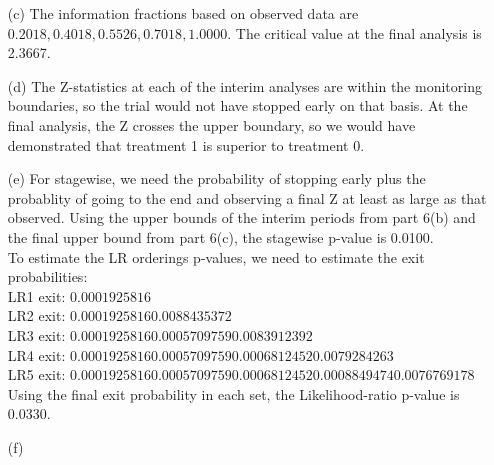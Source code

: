 \documentclass[11pt,a4paper]{article}
\begin{document}
\begin{enumerate}
\begin{enumerate}
\item[(c)] The information fractions based on observed data are $0.2018, 0.4018, 0.5526, 0.7018, 1.0000$. The critical value at the final analysis is 2.3667.

\item[(d)] The Z-statistics at each of the interim analyses are within the monitoring boundaries, so the trial would not have stopped early on that basis. At the final analysis, the Z crosses the upper boundary, so we would have demonstrated that treatment 1 is superior to treatment 0.

\item[(e)] For stagewise, we need the probability of stopping early plus the probablity of going to the end and observing a final Z at least as large as that observed. Using the upper bounds of the interim periods from part 6(b) and the final upper bound from part 6(c), the stagewise p-value is 0.0100. \\

To estimate the LR orderings p-values, we need to estimate the exit probabilities: \\
LR1 exit: $0.0001925816$\\
LR2 exit: $0.0001925816 0.0088435372$\\
LR3 exit: $0.0001925816 0.0005709759 0.0083912392$\\
LR4 exit: $0.0001925816 0.0005709759 0.0006812452 0.0079284263$\\
LR5 exit: $0.0001925816 0.0005709759 0.0006812452 0.0008849474 0.0076769178$\\
Using the final exit probability in each set, the Likelihood-ratio p-value is 0.0330. 

\item[(f)] 


\end{enumerate}

\end{enumerate}
\end{document}

